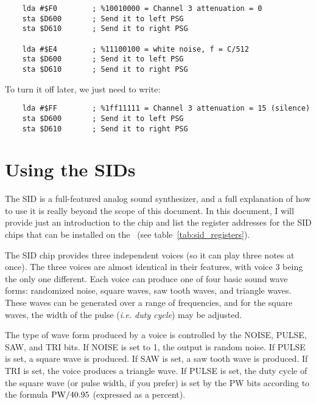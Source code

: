 \begin{verbatim}
    lda #$F0        ; %10010000 = Channel 3 attenuation = 0
    sta $D600       ; Send it to left PSG
    sta $D610       ; Send it to right PSG

    lda #$E4        ; %11100100 = white noise, f = C/512
    sta $D600       ; Send it to left PSG
    sta $D610       ; Send it to right PSG
\end{verbatim}
To turn it off later, we just need to write:

\begin{verbatim}
    lda #$FF        ; %1ff11111 = Channel 3 attenuation = 15 (silence)
    sta $D600       ; Send it to left PSG
    sta $D610       ; Send it to right PSG
\end{verbatim}

\section{Using the SIDs}

The SID is a full-featured analog sound synthesizer, and a full explanation of how to use it is really beyond the scope of this document. In this document, I will provide just an introduction to the chip and list the register addresses for the SID chips that can be installed on the \jr\ (see table~\ref{tab:sid_registers}).

The SID chip provides three independent voices (so it can play three notes at once). The three voices are almost identical in their features, with voice 3 being the only one different. Each voice can produce one of four basic sound wave forms: randomized noise, square waves, saw tooth waves, and triangle waves. These waves can be generated over a range of frequencies, and for the square waves, the width of the pulse ({\it i.e. duty cycle}) may be adjusted.

The type of wave form produced by a voice is controlled by the NOISE, PULSE, SAW, and TRI bits. If NOISE is set to 1, the output is random noise. If PULSE is set, a square wave is produced. If SAW is set, a saw tooth wave is produced. If TRI is set, the voice produces a triangle wave. If PULSE is set, the duty cycle of the square wave (or pulse width, if you prefer) is set by the PW bits according to the formula
${\rm PW} / 40.95$ (expressed as a percent).

